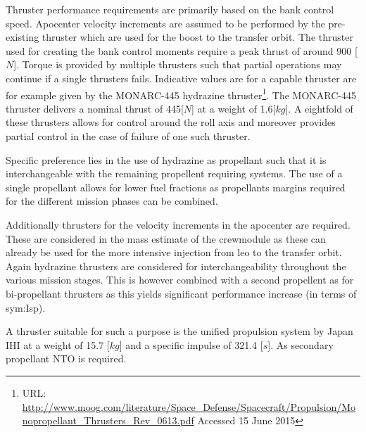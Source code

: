 Thruster performance requirements are primarily based on the bank control speed. Apocenter velocity increments are assumed to be performed by the pre-existing thruster which are used for the boost to the transfer orbit. The thruster used for creating the bank control moments require a peak thrust of around 900 [$N$]. Torque is provided by multiple thrusters such that partial operations may continue if a single thrusters fails.
 Indicative values are for a capable thruster are for example given by the  MONARC-445 hydrazine thruster\footnote{URL: \url{http://www.moog.com/literature/Space\_Defense/Spacecraft/Propulsion/Monopropellant\_Thrusters\_Rev\_0613.pdf} Accessed 15 June 2015}. The MONARC-445 thruster delivers a nominal thrust of 445[$N$] at a weight of 1.6[$kg$].  A eightfold of these thrusters allows for control around the roll axis and moreover provides partial control in the case of failure of one such thruster.
 
 
Specific preference lies in the use of hydrazine as propellant such that it is interchangeable with the remaining propellent requiring systems. The use of a single propellant allows for lower fuel fractions as propellants margins required for the different mission phases can be combined.

Additionally thrusters for the velocity increments in the apocenter are required. These are considered in the mass estimate of the crewmodule as these can already be used for the more intensive injection from \gls{leo} to the transfer orbit. Again hydrazine thrusters are considered for interchangeability throughout the various mission stages. This is however combined with a second propellent as for bi-propellant thrusters as this yields significant performance increase (in terms of \gls{sym:Isp})\cite{Wertz2011}. 

A thruster suitable for such a purpose is the unified propulsion system by Japan IHI at a weight of 15.7 [$kg$] and a specific impulse of 321.4 [$s$]. As secondary propellant NTO is required.



